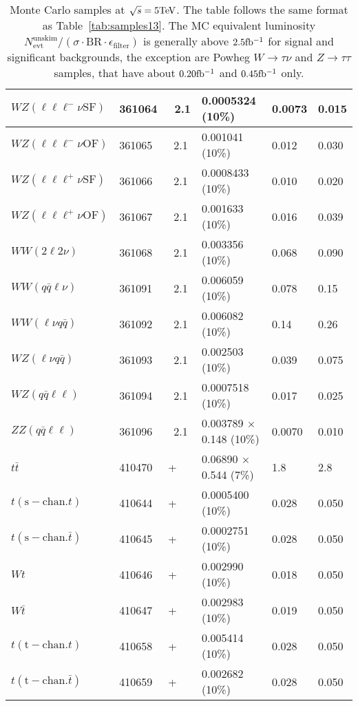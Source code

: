 \begin{table}[htbp]
\begin{center}
\begin{tabular}{l|l|l|l|l|l}
    			$ WZ (\ell\ell\ell^{-}\nu \mathrm{SF}) $ & 361064 & \Sherpa\ 2.1 & 0.0005324 (10\%)  & 0.0073 & 0.015 \\\hline
    			$ WZ (\ell\ell\ell^{-}\nu \mathrm{OF}) $ & 361065 & \Sherpa\ 2.1 & 0.001041 (10\%)  & 0.012 & 0.030 \\\hline
    			$ WZ (\ell\ell\ell^{+}\nu \mathrm{SF}) $ & 361066 & \Sherpa\ 2.1 & 0.0008433 (10\%)  & 0.010 & 0.020 \\\hline
    			$ WZ (\ell\ell\ell^{+}\nu \mathrm{OF}) $ & 361067 & \Sherpa\ 2.1 & 0.001633 (10\%)  & 0.016 & 0.039 \\\hline
    			$ WW (2\ell2\nu) $ & 361068 & \Sherpa\ 2.1 & 0.003356 (10\%)  & 0.068 & 0.090 \\\hline
    			$ WW (q\bar{q}\ell\nu) $ & 361091 & \Sherpa\ 2.1 & 0.006059 (10\%)  & 0.078 & 0.15 \\\hline
    			$ WW (\ell\nu q\bar{q}) $ & 361092 & \Sherpa\ 2.1 & 0.006082 (10\%)  & 0.14 & 0.26 \\\hline
    			$ WZ (\ell\nu q\bar{q}) $ & 361093 & \Sherpa\ 2.1 & 0.002503 (10\%)  & 0.039 & 0.075 \\\hline
    			$ WZ (q\bar{q}\ell\ell) $ & 361094 & \Sherpa\ 2.1 & 0.0007518 (10\%)  & 0.017 & 0.025 \\\hline
    			$ ZZ (q\bar{q}\ell\ell) $ & 361096 & \Sherpa\ 2.1 & 0.003789 $\times$ 0.148 (10\%)  & 0.0070 & 0.010 \\\hline
    			\hline
    			$ t\bar{t} $ & 410470 & \Powheg+\Pythia & 0.06890 $\times$ 0.544 (7\%)  & 1.8 & 2.8 \\\hline
    			$ t (\mathrm{s-chan.} t) $ & 410644 & \Powheg+\Pythia & 0.0005400 (10\%)  & 0.028 & 0.050 \\\hline
    			$ t (\mathrm{s-chan.} \bar{t}) $ & 410645 & \Powheg+\Pythia & 0.0002751 (10\%)  & 0.028 & 0.050 \\\hline
    			$ Wt $ & 410646 & \Powheg+\Pythia & 0.002990 (10\%)  & 0.018 & 0.050 \\\hline
    			$ W\bar{t} $ & 410647 & \Powheg+\Pythia & 0.002983 (10\%)  & 0.019 & 0.050 \\\hline
    			$ t (\mathrm{t-chan.} t) $ & 410658 & \Powheg+\Pythia & 0.005414 (10\%)  & 0.028 & 0.050 \\\hline
    			$ t (\mathrm{t-chan.} \bar{t}) $ & 410659 & \Powheg+\Pythia & 0.002682 (10\%)  & 0.028 & 0.050 \\\hline\hline
    		\end{tabular}
    		\caption{Monte Carlo samples at $\sqrt{s} = 5\text{Te\kern -0.1em V}$. The table
    			follows the same format as Table~\ref{tab:samples13}. The MC equivalent
    			luminosity
    			$N^\mathrm{unskim}_\mathrm{evt}/(\sigma{\cdot}\text{BR}{\cdot}\epsilon_\mathrm{filter})$
    			is generally above $2.5\mbox{fb\(^{-1}\)}$ for signal and significant
    			backgrounds, the exception are Powheg $W\to\tau\nu$ and
    			$Z\to\tau\tau$ samples, that have about $0.20\mbox{fb\(^{-1}\)}$ and $0.45\mbox{fb\(^{-1}\)}$ only.}
    		\label{tab:samples5}
    	\end{center}
    \end{table}
    
